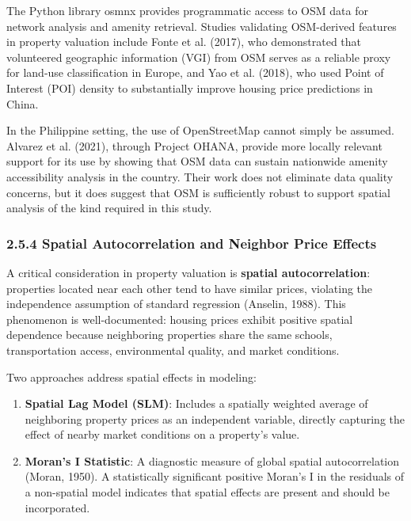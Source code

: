 The Python library osmnx provides programmatic access to OSM data for network analysis and amenity retrieval. Studies validating OSM-derived features in property valuation include Fonte et al. (2017), who demonstrated that volunteered geographic information (VGI) from OSM serves as a reliable proxy for land-use classification in Europe, and Yao et al. (2018), who used Point of Interest (POI) density to substantially improve housing price predictions in China.

In the Philippine setting, the use of OpenStreetMap cannot simply be assumed. Alvarez et al. (2021), through Project OHANA, provide more locally relevant support for its use by showing that OSM data can sustain nationwide amenity accessibility analysis in the country. Their work does not eliminate data quality concerns, but it does suggest that OSM is sufficiently robust to support spatial analysis of the kind required in this study.

\subsubsection{\texorpdfstring{\textbf{2.5.4 Spatial Autocorrelation and Neighbor Price Effects}}{2.5.4 Spatial Autocorrelation and Neighbor Price Effects}}\label{spatial-autocorrelation-and-neighbor-price-effects}

A critical consideration in property valuation is \textbf{spatial autocorrelation}: properties located near each other tend to have similar prices, violating the independence assumption of standard regression (Anselin, 1988). This phenomenon is well-documented: housing prices exhibit positive spatial dependence because neighboring properties share the same schools, transportation access, environmental quality, and market conditions.

Two approaches address spatial effects in modeling:

\begin{enumerate}
\item \textbf{Spatial Lag Model (SLM)}: Includes a spatially weighted average of neighboring property prices as an independent variable, directly capturing the effect of nearby market conditions on a property's value.
\item \textbf{Moran's I Statistic}: A diagnostic measure of global spatial autocorrelation (Moran, 1950). A statistically significant positive Moran's I in the residuals of a non-spatial model indicates that spatial effects are present and should be incorporated.
\end{enumerate}


